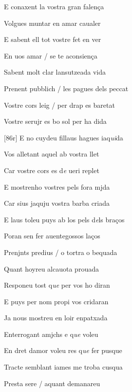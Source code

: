 \documentclass[12pt]{article}
\begin{document}
\begin{estrofa}

 E conaxent la vostra gran falen\c{c}a

 Volgues muntar en amar caualer

 E sabent ell tot vostre fet en ver

 En uos amar / se te aconsien\c{c}a

 Sabent molt clar lansutzeada vida

 Prenent pubblich / les pagues dels peccat

 Vostre cors leig / per drap es baretat

 Vostre serujr es bo sol per ha dida

\end{estrofa}



\begin{estrofa}

 [86r] E no cuydeu fillaus hagues iaq\textit{ui}da

 Vos alletant aquel ab vostra llet

 Car vostre cors es d\textit{e} ueri replet

 E mostrenho vostres pels fora mjda

 Car sius jaquju vostra barba criada

 E laus toleu puys ab los pels d\textit{e}ls bra\c{c}os

 Poran sen fer auentegossos la\c{c}os

 Prenjnts predius / o tortra o bequada

\end{estrofa}



\begin{estrofa}

 Quant hoyreu alcauota prouada

 Responeu tost q\textit{ue} per vos ho diran

 E puys per nom propi vos cridaran

 Ja nous mostreu en loir enpatxada

 Enterrogant amjchs e q\textit{ue} voleu

 En dret damor voleu res q\textit{ue} fer pusque

 Tracte semblant iames me troba cusqua

 Presta sere / aquant demanareu

\end{estrofa}
\end{document}

